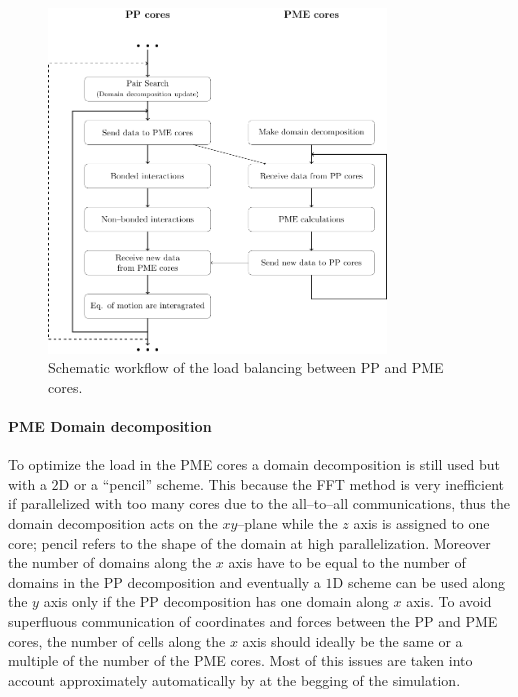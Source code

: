 \begin{figure}[h!t]
	\centering
	\includegraphics[width=0.8\textwidth]{./img/Schemi/PPPMECores}
	\caption{Schematic workflow of the load balancing between \acs{PP} and \acs{PME} cores.}
	\label{fig:PPPMECores}
\end{figure}

\paragraph{\textbf{PME Domain decomposition}} To optimize the load in the \ac{PME} cores a domain decomposition is still used but with a $2$D or a ``pencil'' scheme. This because the \ac{FFT} method is very inefficient if parallelized with too many cores due to the all--to--all communications, thus the domain decomposition acts on the $xy$--plane while the $z$ axis is assigned to one core; pencil refers to the shape of the domain at high parallelization. Moreover the number of domains along the $x$ axis have to be equal to the number of domains in the \ac{PP} decomposition and eventually a $1$D scheme can be used along the $y$ axis only if the \ac{PP} decomposition has one domain along $x$ axis. To avoid superfluous communication of coordinates and forces between the \ac{PP} and \ac{PME} cores, the number of cells along the $x$ axis should ideally be the same or a multiple of the number of the \ac{PME} cores. Most of this issues are taken into account approximately automatically by \gromacs at the begging of the simulation.

